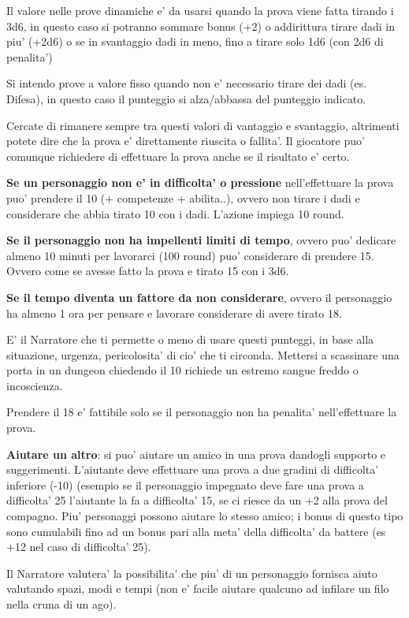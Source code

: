 \documentclass[a4paper,11pt,twoside,openany]{dndbook}
\begin{document}
\bigskip

Il valore nelle prove dinamiche e' da usarsi quando la prova viene fatta tirando i 3d6, in questo caso si potranno sommare bonus (+2) o addirittura tirare dadi in piu' (+2d6) o se in svantaggio dadi in meno, fino a tirare solo 1d6 (con 2d6 di penalita')

Si intendo prove a valore fisso quando non e' necessario tirare dei dadi (es. Difesa), in questo caso il punteggio si alza/abbassa del punteggio indicato.

Cercate di rimanere sempre tra questi valori di vantaggio e svantaggio, altrimenti potete dire che la prova e' direttamente riuscita o fallita'.
Il giocatore puo' comunque richiedere di effettuare la prova anche se il risultato e' certo.

\textbf{Se un personaggio non e' in difficolta' o pressione} nell'effettuare la prova puo' prendere il 10 (+ competenze + abilita..), ovvero non tirare i dadi e considerare che abbia tirato 10 con i dadi. L'azione impiega 10 round.

\textbf{Se il personaggio non ha impellenti limiti di tempo}, ovvero puo' dedicare almeno 10 minuti per lavorarci (100 round) puo' considerare di prendere 15. Ovvero come se avesse fatto la prova e tirato 15 con i 3d6.

\textbf{Se il tempo diventa un fattore da non considerare}, ovvero il personaggio ha almeno 1 ora per pensare e lavorare considerare di avere tirato 18.

E' il Narratore che ti permette o meno di usare questi punteggi, in base alla situazione, urgenza, pericolosita' di cio' che ti circonda. Mettersi a scassinare una porta in un dungeon chiedendo il 10 richiede un estremo sangue freddo o incoscienza.

Prendere il 18 e' fattibile solo se il personaggio non ha penalita'
nell'effettuare la prova.

\textbf{Aiutare un altro}: si puo' aiutare un amico in una prova dandogli supporto e suggerimenti. L'aiutante deve effettuare una prova a due gradini di difficolta' inferiore (-10) (esempio se il personaggio impegnato deve fare una prova a difficolta' 25 l'aiutante la fa a difficolta' 15, se ci riesce da un +2 alla prova del compagno. Piu' personaggi possono aiutare lo stesso amico; i bonus di questo tipo sono cumulabili fino ad un bonus pari alla meta' della difficolta' da battere (es +12 nel caso di difficolta' 25).

Il Narratore valutera' la possibilita' che piu' di un personaggio fornisca aiuto valutando spazi, modi e tempi (non e' facile aiutare qualcuno ad infilare un filo nella cruna di un ago).
\end{document}
